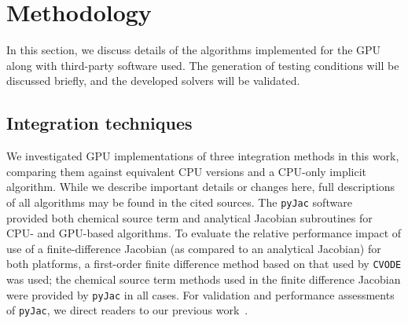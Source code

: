 \documentclass[final,twocolumn]{elsarticle}
\begin{document}
\section{Methodology}
\label{S:method}
\ifmeasure
\addvspace{10pt}
\fi

In this section, we discuss details of the algorithms implemented for the GPU along with third-party software used.
The generation of testing conditions will be discussed briefly, and the developed solvers will be validated.

\subsection{Integration techniques}

We investigated GPU implementations of three integration methods in this work, comparing them against equivalent CPU versions and a CPU-only implicit algorithm.
While we describe important details or changes here, full descriptions of all algorithms may be found in the cited sources.
The \texttt{pyJac} software~\cite{niemeyer_2016_51139,Niemeyer:2015ws,2016arXiv160503262N} provided both chemical source term and analytical Jacobian subroutines for CPU- and GPU-based algorithms.
To evaluate the relative performance impact of use of a finite-difference Jacobian (as compared to an analytical Jacobian) for both platforms, a first-order finite difference method based on that used by \texttt{CVODE} was used; the chemical source term methods used in the finite difference Jacobian were provided by \texttt{pyJac} in all cases.
For validation and performance assessments of \texttt{pyJac}, we direct readers to our previous work~\cite{Niemeyer:2015ws,2016arXiv160503262N}.
\end{document}
